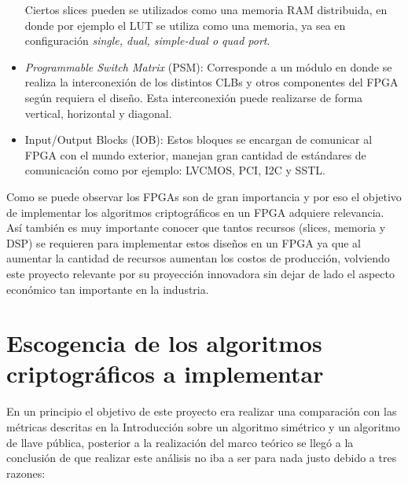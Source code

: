 \begin{itemize}
Ciertos slices pueden se utilizados como una memoria RAM distribuida, en donde por ejemplo el LUT se utiliza como una memoria, ya sea en configuración \textit{single, dual, simple-dual o quad port}. 

\item \textit{Programmable Switch Matrix} (PSM): Corresponde a un módulo en donde se realiza la interconexión de los distintos CLBs y otros componentes del FPGA según requiera el diseño. Esta interconexión puede realizarse de forma vertical, horizontal y diagonal.


\item Input/Output Blocks (IOB): Estos bloques se encargan de comunicar al FPGA con el mundo exterior, manejan gran cantidad de estándares de comunicación como por ejemplo: LVCMOS, PCI, I2C y SSTL.
\end{itemize}


Como se puede observar los FPGAs son de gran importancia y por eso el objetivo de implementar los algoritmos criptográficos en un FPGA adquiere relevancia. Así también es muy importante conocer que tantos recursos (slices, memoria y DSP) se requieren para implementar estos diseños en un FPGA ya que al aumentar la cantidad de recursos aumentan los costos de producción, volviendo este proyecto relevante por su proyección innovadora sin dejar de lado el aspecto económico tan importante en la industria. 






\section{Escogencia de los algoritmos criptográficos a implementar}
En un principio el objetivo de este proyecto era realizar una comparación con las métricas descritas en la Introducción sobre un algoritmo simétrico y un algoritmo de llave pública, posterior a la realización del marco teórico se llegó a la conclusión de que realizar este análisis no iba a ser para nada justo debido a tres razones:

